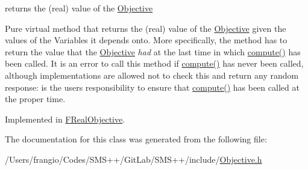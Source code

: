 returns the (real) value of the \mbox{\hyperlink{class_s_m_spp__di__unipi__it_1_1_objective}{Objective}} 

Pure virtual method that returns the (real) value of the \mbox{\hyperlink{class_s_m_spp__di__unipi__it_1_1_objective}{Objective}} given the values of the Variables it depends onto. More specifically, the method has to return the value that the \mbox{\hyperlink{class_s_m_spp__di__unipi__it_1_1_objective}{Objective}} {\itshape had} at the last time in which \mbox{\hyperlink{class_s_m_spp__di__unipi__it_1_1_objective_a504d4e3e174c7a518cc66156a8a45ce5}{compute()}} has been called. It is an error to call this method if \mbox{\hyperlink{class_s_m_spp__di__unipi__it_1_1_objective_a504d4e3e174c7a518cc66156a8a45ce5}{compute()}} has never been called, although implementations are allowed not to check this and return any random response\+: is the users\textquotesingle{} responsibility to ensure that \mbox{\hyperlink{class_s_m_spp__di__unipi__it_1_1_objective_a504d4e3e174c7a518cc66156a8a45ce5}{compute()}} has been called at the proper time. 

Implemented in \mbox{\hyperlink{class_s_m_spp__di__unipi__it_1_1_f_real_objective_a5733803d5bd031be89b835e0bfe3b9c2}{F\+Real\+Objective}}.



The documentation for this class was generated from the following file\+:\begin{DoxyCompactItemize}
\item 
/\+Users/frangio/\+Codes/\+S\+M\+S++/\+Git\+Lab/\+S\+M\+S++/include/\mbox{\hyperlink{_objective_8h}{Objective.\+h}}\end{DoxyCompactItemize}

